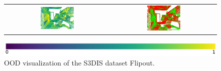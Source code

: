 \begin{figure}[h!]
\begin{tabular}{cc}
                \includegraphics[width=0.33\textwidth, height=0.18\textheight]{images/ood_imgs/fout_s3dis/ofc_42_fout_prob.png}& 
                \includegraphics[width=0.33\textwidth, height=0.18\textheight]{images/ood_imgs/fout_s3dis/fout_prob_1.png}\\
            \end{tabular}
            \includegraphics[scale=0.45]{images/prob_legend.pdf}
            \caption{OOD visualization of the S3DIS dataset Flipout.}
            \label{fig:fout_s3dis_oodmap_prob}
        \end{figure}


